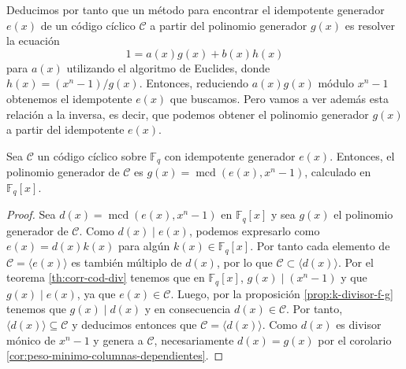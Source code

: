 Deducimos por tanto que un método para encontrar el idempotente generador \(e(x)\) de un código cíclico \(\mathcal C\) a partir del polinomio generador \(g(x)\) es resolver la ecuación \[1 = a(x)g(x) + b(x)h(x)\] para \(a(x)\) utilizando el algoritmo de Euclides, donde \(h(x) = (x^n - 1)/g(x)\).
Entonces, reduciendo \(a(x)g(x)\) módulo \(x^n - 1\) obtenemos el idempotente \(e(x)\) que buscamos.
Pero vamos a ver además esta relación a la inversa, es decir, que podemos obtener el polinomio generador \(g(x)\) a partir del idempotente \(e(x)\).

\begin{theorem}
  Sea \(\mathcal C\) un código cíclico sobre \(\mathbb F_q\) con idempotente generador \(e(x)\).
  Entonces, el polinomio generador de \(\mathcal C\) es \(g(x) = \operatorname{mcd}(e(x), x^n - 1)\), calculado en \(\mathbb F_q[x]\). 
\end{theorem}

\begin{proof}
  Sea \(d(x) = \operatorname{mcd}(e(x), x^n - 1)\) en \(\mathbb F_q[x]\) y sea \(g(x)\) el polinomio generador de \(\mathcal C\).
  Como \(d(x) \mid e(x)\), podemos expresarlo como \(e(x) = d(x)k(x)\) para algún \(k(x) \in \mathbb F_q[x]\).
  Por tanto cada elemento de \(\mathcal C = \langle e(x) \rangle\) es también múltiplo de \(d(x)\), por lo que \(\mathcal C \subset \langle d(x) \rangle\).
  Por el teorema \ref{th:corr-cod-div} tenemos que en \(\mathbb F_q[x]\), \(g(x) \mid (x^n -1)\) y que \(g(x) \mid e(x)\), ya que \(e(x) \in \mathcal C\).
  Luego, por la proposición \ref{prop:k-divisor-f-g} tenemos que \(g(x) \mid d(x)\) y en consecuencia \(d(x) \in \mathcal C\).
  Por tanto, \(\langle d(x) \rangle \subseteq \mathcal C\) y deducimos entonces que \(\mathcal C = \langle d(x) \rangle\).
  Como \(d(x)\) es divisor mónico de \(x^n - 1\) y genera a \(\mathcal C\), necesariamente \(d(x) = g(x)\) por el corolario \ref{cor:peso-minimo-columnas-dependientes}. 
\end{proof}


